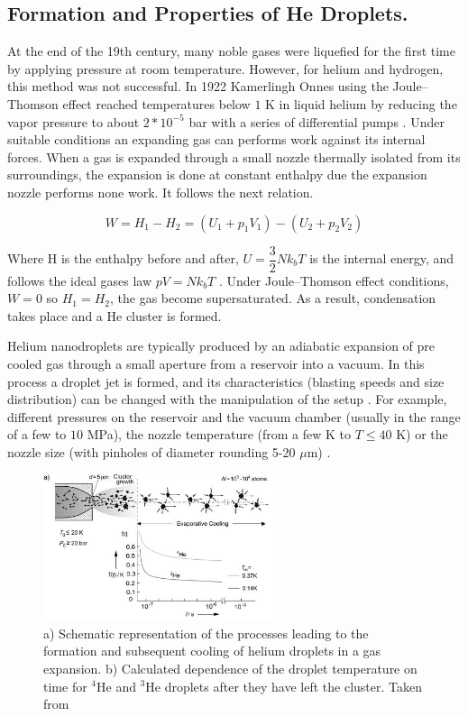 \subsection{Formation and Properties of He Droplets.}

At the end  of the 19th century, many noble gases were liquefied for the first time by applying pressure at room temperature. However, for helium and hydrogen, this method was not successful. In 1922 Kamerlingh Onnes using the Joule–Thomson effect \cite{weinberger_discovery_2013} reached temperatures below $1$ K in liquid helium by reducing the vapor pressure to about $2*10^{-5}$ bar with a series of differential pumps \cite{van_delft_discovery_2010}. Under suitable conditions an expanding gas can performs work against its internal forces. When a gas is expanded through a small nozzle thermally isolated from its surroundings, the expansion is done at constant enthalpy due the expansion nozzle performs none work. It follows the next relation.

\begin{equation}
W= H_{1}-H_{2} = (U_{1}+p_{1}V_{1})-(U_{2}+p_{2}V_{2})
\end{equation}

Where H is the enthalpy before and after, $U=\dfrac{3}{2}Nk_{b}T$ is the internal energy, and follows the  ideal gases law $pV=Nk_{b}T$ \cite{enss_low-temperature_2005}. Under Joule–Thomson effect conditions, $W=0$ so $H_{1}=H_{2}$, the gas become supersaturated. As a result, condensation takes place and a He cluster is formed.

Helium nanodroplets are typically produced by an adiabatic expansion of pre cooled gas through a small aperture from a reservoir into a vacuum. In this process a droplet jet is formed, and its characteristics (blasting speeds and size distribution) can be changed with the manipulation of the setup \cite{stienkemeier_spectroscopy_2006}. For example, different pressures on the reservoir and the vacuum chamber (usually in the range of a few to $10$ MPa), the nozzle temperature (from a few K to $T \leqslant 40$ K) or the nozzle size (with pinholes of diameter rounding 5-20 $\mu$m) \cite{schomas_compact_2017}.

\begin{figure}[h!]
\centering
	\includegraphics[width=0.6\textwidth]{../Images/jet_scketch.png}
	\caption[Scheme for a nozzle expansion]{ a) Schematic representation of the processes leading to the formation and subsequent cooling of helium droplets in a gas expansion. b) Calculated dependence of the droplet temperature on time for $^{4}$He and $^{3}$He droplets after they have left the cluster. Taken from \cite{toennies_superfluid_2004}	}
	\label{img:jet}	
\end{figure}

